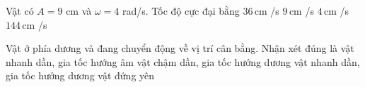 \begin{ex}
Vật có $A=9$ cm và $\omega=4$ rad/s. Tốc độ cực đại bằng
\choice
{\True $36\,\text{cm}$ /s}
{$9\,\text{cm}$ /s}
{$4\,\text{cm}$ /s}
{$144\,\text{cm}$ /s}
\end{ex}

\begin{ex}
Vật ở phía dương và đang chuyển động về vị trí cân bằng. Nhận xét đúng là
\choice
{\True vật nhanh dần, gia tốc hướng âm}
{vật chậm dần, gia tốc hướng dương}
{vật nhanh dần, gia tốc hướng dương}
{vật đứng yên}
\end{ex}
